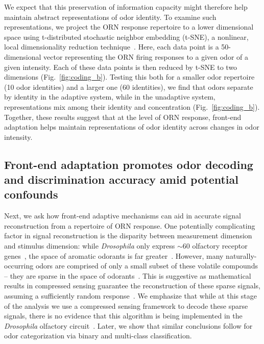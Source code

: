 \documentclass[9pt,twocolumn,twoside,lineno]{pnas-new}
\begin{document}
We expect that this preservation of information capacity might therefore help maintain  abstract representations of odor identity. To examine such  representations, we project the ORN  response repertoire to a lower dimensional space using t-distributed stochastic neighbor embedding (t-SNE), a nonlinear, local dimensionality reduction technique~\cite{tsne}. Here, each data point is a 50-dimensional vector representing the ORN firing responses to a given odor of a given intensity. Each of these data points is then reduced by t-SNE to  two dimensions (Fig.~\ref{fig:coding_b}). %
Testing this both for a smaller odor repertoire (10 odor identities) and a larger one (60 identities), we find that odors  separate by identity in the adaptive system, while in the unadaptive system, representations  mix among their identity and concentration (Fig.~\ref{fig:coding_b}). Together, these results suggest that at the level of ORN response, front-end adaptation helps maintain representations of odor identity across changes in odor intensity.




\subsection{Front-end adaptation promotes odor decoding and discrimination accuracy amid potential confounds}

Next, we ask how front-end adaptive mechanisms can aid in accurate signal reconstruction from a repertoire of ORN response.  One potentially complicating factor in signal reconstruction is the disparity between measurement dimension and stimulus dimension: while \textit{Drosophila} only express $\sim 60$ olfactory receptor genes~\cite{olfactory_sensory_map}, the space of aromatic odorants is far greater~\cite{vijay_1}. However, many naturally-occurring odors are comprised of only a small subset of these volatile compounds -- they are sparse in the space of odorants~\cite{vijay_1}. This is suggestive as mathematical results in compressed sensing guarantee the reconstruction of these sparse signals, assuming a sufficiently random response~\cite{CS_donoho, CS_tao, CS_ganguli}. We emphasize that while at this stage of the analysis we use a compressed sensing framework to decode these sparse signals, there is no evidence that this algorithm is being implemented in the \textit{Drosophila} olfactory circuit~\cite{chlovskii_pevlavan}. Later, we show that similar conclusions follow for odor categorization via binary and multi-class classification.
\end{document}
